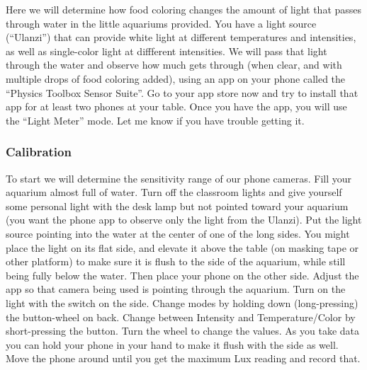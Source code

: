 Here we will determine how food coloring changes the amount of light that passes through water in the little aquariums provided.  You have a light source (``Ulanzi'') that can provide white light at different temperatures and intensities, as well as single-color light at diffferent intensities.  We will pass that light through the water and observe how much gets through (when clear, and with multiple drops of food coloring added), using an app on your phone called the ``Physics Toolbox Sensor Suite''.    Go to your app store now and try to install that app for at least two phones at your table.  Once you have the app, you will use the ``Light Meter'' mode. Let me know if you have trouble getting it.

\subsubsection{Calibration}

\noindent To start we will determine the sensitivity range of our phone cameras.  Fill your aquarium almost full of water. Turn off the classroom lights and give yourself some personal light with the desk lamp but not pointed toward your aquarium (you want the phone app to observe only the light from the Ulanzi). Put the light source pointing into the water at the center of one of the long sides.  You might place the light on its flat side, and elevate it above the table (on masking tape or other platform) to make sure it is flush to the side of the aquarium, while still being fully below the water. Then place your phone on the other side.    Adjust the app so that camera being used is pointing through the aquarium.   Turn on the light with the switch on the side.  Change modes by holding down (long-pressing) the button-wheel on back. Change between Intensity and Temperature/Color by short-pressing the button. Turn the wheel to change the values.  As you take data you can hold your phone in your hand to make it flush with the side as well. Move the phone around until you get the maximum Lux reading and record that.   \\[-6pt]

